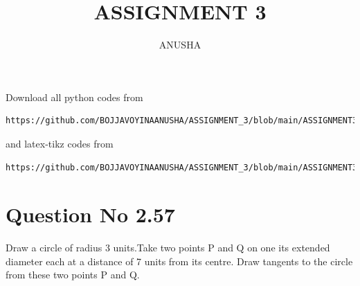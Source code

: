 \documentclass[journal,12pt,twocolumn]{IEEEtran}
\begin{document}
     \def\rightbox#1{\makebox[0in][r]{#1}}
     \def\centbox#1{\makebox[0in]{#1}}
     \def\topbox#1{\raisebox{-\baselineskip}[0in][0in]{#1}}
     \def\midbox#1{\raisebox{-0.5\baselineskip}[0in][0in]{#1}}
\vspace{3cm}
\title{ASSIGNMENT 3}
\author{ANUSHA}
\maketitle
\newpage
\bigskip
\renewcommand{\thefigure}{\theenumi}
\renewcommand{\thetable}{\theenumi}
Download all python codes from 
\begin{lstlisting}
https://github.com/BOJJAVOYINAANUSHA/ASSIGNMENT_3/blob/main/ASSIGNMENT3/assignment3.py
\end{lstlisting}
%
and latex-tikz codes from 
%
\begin{lstlisting}
https://github.com/BOJJAVOYINAANUSHA/ASSIGNMENT_3/blob/main/ASSIGNMENT3/ASSIGNMENT3.tex
\end{lstlisting}
%
\section{Question No 2.57}
Draw a circle of radius 3 units.Take two points P and Q on one its extended diameter each at a distance of 7 units from its centre. Draw tangents to the circle from these two points P and Q. 
%
\end{document}
